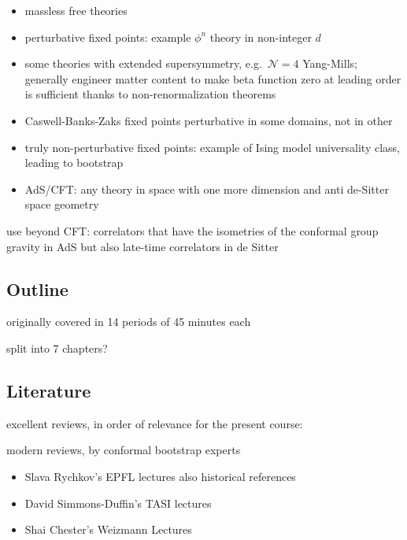\documentclass[a4paper,12pt]{article}
\numberwithin{equation}{section}
\begin{document}
\begin{itemize}

\item
massless free theories

\item
perturbative fixed points: example $\phi^n$ theory in non-integer $d$

\item
some theories with extended supersymmetry, e.g.~$\mathcal{N} = 4$ Yang-Mills;
generally engineer matter content to make beta function zero at leading order is sufficient thanks to non-renormalization theorems

\item
Caswell-Banks-Zaks fixed points
perturbative in some domains, not in other

\item
truly non-perturbative fixed points: example of Ising model universality class, leading to bootstrap

\item
AdS/CFT: any theory in space with one more dimension and anti de-Sitter space geometry

\end{itemize}

use beyond CFT:
correlators that have the isometries of the conformal group
gravity in AdS
but also late-time correlators in de Sitter

\subsection{Outline}

originally covered in 14 periods of 45 minutes each

split into 7 chapters?


\subsection{Literature}


excellent reviews, in order of relevance for the present course:


modern reviews, by conformal bootstrap experts
\begin{itemize}

\item
Slava Rychkov's EPFL lectures
\cite{Rychkov:2016iqz}
also historical references

\item
David Simmons-Duffin's TASI lectures
\cite{Simmons-Duffin:2016gjk}

\item
Shai Chester's Weizmann Lectures
\cite{Chester:2019wfx}


\end{itemize}
\end{document}
